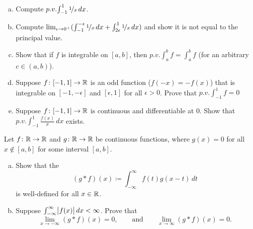 \begin{exercise}
\leavevmode
\begin{enumerate}[a)]
\item
Compute $p.v.\!\int_{-1}^1 \nicefrac{1}{x}\,dx$.
\item
Compute
$\lim_{\epsilon\to 0^+}
( \int_{-1}^{-\epsilon} \nicefrac{1}{x}\,dx + 
\int_{2\epsilon}^1 \nicefrac{1}{x}\,dx )$ and show it is not equal
to the principal value.
\item
Show that if $f$ is integrable on $[a,b]$, then
$p.v.\!\int_a^b f = \int_a^b f$ (for an arbitrary $c \in (a,b)$).
\item
Suppose $f \colon [-1,1] \to {\mathbb{R}}$
is an odd function ($f(-x)=-f(x)$) that is integrable on
$[-1,-\epsilon]$ and $[\epsilon,1]$ for all $\epsilon >0$.
Prove that 
$p.v.\!\int_{-1}^1 f = 0$
\item
Suppose 
$f \colon [-1,1] \to {\mathbb{R}}$ is continuous and differentiable at 0.  Show that
$p.v.\!\int_{-1}^1 \frac{f(x)}{x}\,dx$ exists.
\end{enumerate}
\end{exercise}

\begin{samepage}
\begin{exercise}
Let $f \colon {\mathbb{R}} \to {\mathbb{R}}$ and 
$g \colon {\mathbb{R}} \to {\mathbb{R}}$ be continuous functions, where
$g(x) = 0$ for all $x \notin [a,b]$ for some interval $[a,b]$.
\begin{enumerate}[a)]
\item
Show that the
\emph{}
\begin{equation*}
(g * f)(x) \coloneqq \int_{-\infty}^\infty f(t)g(x-t)\,dt 
\end{equation*}
is well-defined for all $x \in {\mathbb{R}}$.
\item
Suppose $\int_{-\infty}^\infty \bigl\lvert {f(x)} \bigr\rvert\,dx < \infty$.  Prove that
\begin{equation*}
\lim_{x \to -\infty} (g * f)(x) = 0, \qquad \text{and} \qquad
\lim_{x \to \infty} (g * f)(x) = 0 .
\end{equation*}
\end{enumerate}
\end{exercise}
\end{samepage}
